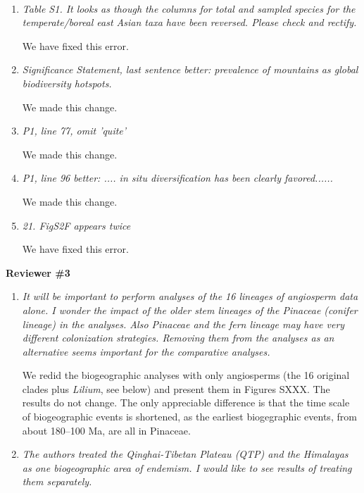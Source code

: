 \documentclass[12pt]{letter}
\begin{document}
\begin{letter}{ \\

}
\begin{enumerate}
\item \textit{Table S1. It looks as though the columns for total and
    sampled species for the temperate/boreal east Asian taxa have been
    reversed. Please check and rectify.}

  We have fixed this error.

\item \textit{Significance Statement, last sentence better: prevalence
    of mountains as global biodiversity hotspots.}

  We made this change.

\item \textit{P1, line 77, omit 'quite'}

  We made this change.

\item \textit{P1, line 96 better: .... in situ diversification has
    been clearly favored......}

  We made this change.

\item \textit{21. FigS2F appears twice}

  We have fixed this error.

\end{enumerate}


\textbf{Reviewer \#3}

\begin{enumerate}

\item \textit{It will be important to perform analyses of the 16
    lineages of angiosperm data alone. I wonder the impact of the
    older stem lineages of the Pinaceae (conifer lineage) in the
    analyses. Also Pinaceae and the fern lineage may have very
    different colonization strategies. Removing them from the analyses
    as an alternative seems important for the comparative analyses.}

  We redid the biogeographic analyses with only angiosperms (the 16
  original clades plus \textit{Lilium}, see below) and present them in
  Figures SXXX. The results do not change. The only appreciable
  difference is that the time scale of biogeographic events is
  shortened, as the earliest biogegraphic events, from about 180--100
  Ma, are all in Pinaceae.

\item \textit{The authors treated the Qinghai-Tibetan Plateau (QTP)
    and the Himalayas as one biogeographic area of endemism. I would
    like to see results of treating them separately.}


\end{enumerate}
\end{letter}
\end{document}
